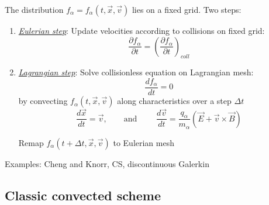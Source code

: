 \documentclass{beamer}
\begin{document}
\begin{frame}{\subsecname}
The distribution $f_{\alpha} = f_{\alpha}(t,\vec{x},\vec{v})$ lies on a fixed grid. Two steps:

\begin{enumerate}
\item \emph{\underline{Eulerian step}}: Update velocities according to collisions on fixed grid:
$$\frac{\partial f_{\alpha}}{\partial t} = \left(\frac{\partial f_{\alpha}}{\partial t}\right)_{coll}$$ 
\item \emph{\underline{Lagrangian step}}: Solve collisionless equation on Lagrangian mesh:
$$\frac{df_{\alpha}}{dt} = 0$$
by convecting $f_{\alpha}(t,\vec{x},\vec{v})$ along characteristics over a step $\Delta t$
$$\frac{d\vec{x}}{dt} = \vec{v}, \qquad \text{and } \qquad \frac{d\vec{v}}{dt} =  \frac{q_{\alpha}}{m_{\alpha}}\left( \vec{E} + \vec{v} \times \vec{B}\right)$$

Remap $f_{\alpha}(t + \Delta t, \vec{x}, \vec{v})$ to Eulerian mesh

\end{enumerate} 

Examples: Cheng and Knorr,  CS, discontinuous Galerkin
  

\end{frame}



\subsection{Classic convected scheme}

\end{document}

